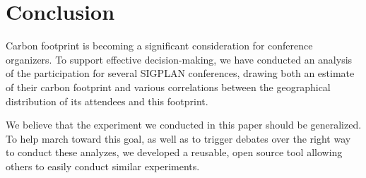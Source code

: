\section{Conclusion}

Carbon footprint is becoming a significant consideration for conference
organizers. To support effective decision-making, we have conducted an
analysis of the participation for several SIGPLAN conferences, drawing both
an estimate of their carbon footprint and various correlations between the
geographical distribution of its attendees and this footprint.


We believe that the experiment we conducted in this paper should be
generalized.  To help march toward this goal, as well as to trigger debates
over the right way to conduct these analyzes, we developed a reusable, open
source tool allowing others to easily conduct similar experiments.
